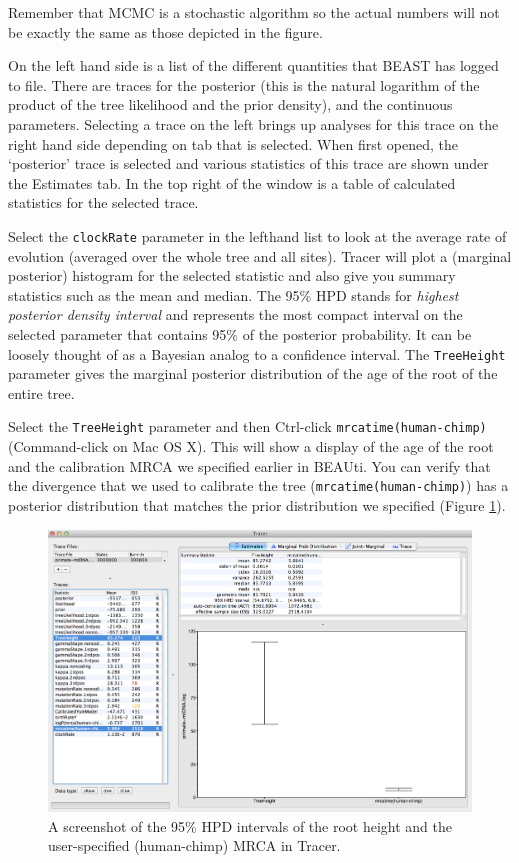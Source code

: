 \documentclass[11pt]{article}
\theoremstyle{plain}%
\theoremstyle{definition}
\theoremstyle{remark}
\begin{document}
Remember that MCMC is a stochastic algorithm so the actual numbers will not be exactly the same as those depicted in the figure.

On the left hand side is a list of the different quantities that BEAST has logged to file. 
There are traces for the posterior (this
is the natural logarithm of the product of the tree likelihood and the prior density), and the continuous parameters. Selecting a trace
on the left brings up analyses for this trace on the right hand side depending on tab that is selected. When first opened, the
`posterior' trace is selected and various statistics of this trace are shown under the Estimates tab.
In the top right of the window is a table of calculated statistics for the selected trace. 

Select the \texttt{clockRate} parameter in the lefthand list to look at
the average rate of evolution (averaged over the whole tree and all sites). Tracer will plot a (marginal posterior) histogram for the selected statistic and also give you
summary statistics such as the mean and median. The 95\% HPD stands for {\it highest posterior density interval} and represents the most compact interval on the selected parameter that contains 95\% of the posterior probability. It can be loosely thought of as a Bayesian analog to a confidence interval. The \texttt{TreeHeight} parameter gives the marginal posterior distribution of the age of the root of the entire tree.

Select the \texttt{TreeHeight} parameter and then Ctrl-click \texttt{mrcatime(human-chimp)}  (Command-click on Mac OS X). This will show a display of the
age of the root and the calibration MRCA we specified earlier in BEAUti. You can verify that the divergence that we used to calibrate the tree
(\texttt{mrcatime(human-chimp)}) has a posterior distribution that matches the prior distribution we specified (Figure \ref{fig:Tracer_divergences}).

\begin{figure}
\includegraphics[width=\textwidth]{figures/Tracer_divergences}
\caption{A screenshot of the 95\% HPD intervals of the root height and the user-specified (human-chimp) MRCA in Tracer.}
\label{fig:Tracer_divergences}
\end{figure}
\end{document}
